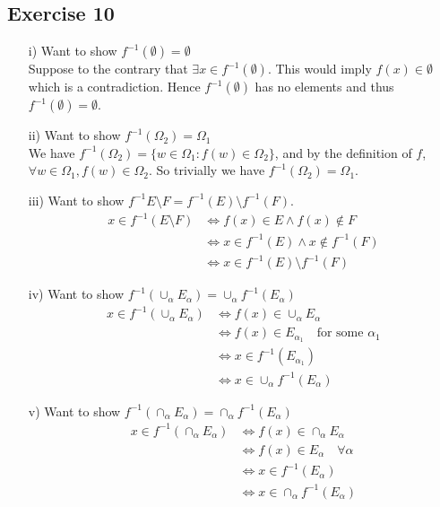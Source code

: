 \documentclass[a4paper, 12pt, twoside]{article}
\begin{document}
\subsection*{Exercise 10}
\begin{itemize}
    \item[i)]Want to show $f^{-1}(\emptyset)=\emptyset$\\
    Suppose to the contrary that $\exists x\in f^{-1}(\emptyset)$. This would imply $f(x)\in\emptyset$ which is a contradiction. Hence $f^{-1}(\emptyset)$ has no elements and thus $f^{-1}(\emptyset)=\emptyset$.
    \item[ii)] Want to show $f^{-1}(\Omega_{2})=\Omega_{1}$\\
    We have $ f^{-1}(\Omega_{2})=\{w\in\Omega_{1}:f(w)\in\Omega_{2}\}$, and by the definition of $f$, $\forall w\in\Omega_{1},f(w)\in\Omega_{2}$. So trivially we have $f^{-1}(\Omega_{2})=\Omega_{1} $.
    \item[iii)] Want to show $f^{-1}{E\text{\textbackslash} F}=
    f^{-1}(E)\text{\textbackslash} f^{-1}(F)$.
    \begin{align*}
        x\in f^{-1}(E\text{\textbackslash} F) &\iff f(x)\in E \wedge f(x)\not\in F\\
        &\iff x\in f^{-1}(E)\wedge x\not\in f^{-1}(F)\\
        &\iff x\in f^{-1}(E)\text{\textbackslash} f^{-1}(F)
    \end{align*}
    \item[iv)] Want to show $f^{-1}(\cup_{\alpha}E_{\alpha}) = \cup_{\alpha}f^{-1}(E_{\alpha}) $
    \begin{align*}
            x\in f^{-1}(\cup_{\alpha}E_{\alpha}) &\iff f(x)\in\cup_{\alpha}E_{\alpha}\\
            &\iff f(x)\in E_{\alpha_{1}} \quad\text{for some } \alpha_{1}\\
            &\iff x\in f^{-1}(E_{\alpha_{1}})\\
            &\iff x\in\cup_{\alpha}f^{-1}(E_{\alpha})
    \end{align*}
    \item[v)] Want to show $f^{-1}(\cap_{\alpha}E_{\alpha})=\cap_{\alpha}f^{-1}(E_{\alpha}) $
    \begin{align*}
            x\in f^{-1}(\cap_{\alpha}E_{\alpha}) &\iff f(x)\in\cap_{\alpha}E_{\alpha}\\
            &\iff f(x)\in E_{\alpha} \quad\forall\alpha\\
            &\iff x\in f^{-1}(E_{\alpha})\\
            &\iff x\in\cap_{\alpha}f^{-1}(E_{\alpha})
    \end{align*}
\end{itemize}
\end{document}
